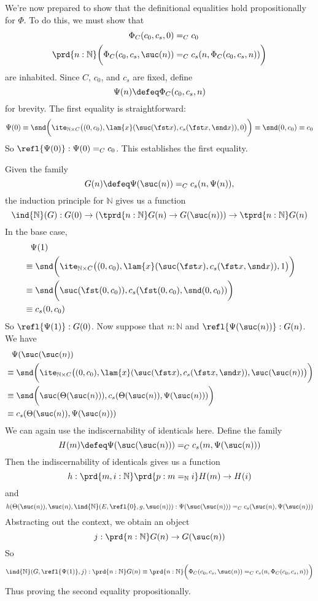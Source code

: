 We're now prepared to show that the definitional equalities hold
propositionally for $\Phi$.  To do this, we must show that
\begin{align*}
  \Phi_{C}(c_{0}, c_{s}, 0) &=_{C} c_{0} \\
  \prd{n:\mathbb{N}}\bigg(\Phi_{C}(c_{0}, c_{s}, \suc(n)) &=_{C} c_{s}(n,
  \Phi_{C}(c_{0}, c_{s}, n)) \bigg)
\end{align*}
are inhabited.  Since $C$, $c_{0}$, and $c_{s}$ are fixed, define
\[
  \Psi(n) \defeq \Phi_{C}(c_{0}, c_{s}, n)
\]
for brevity. The first equality is straightforward:
\[
  \Psi(0)
  \equiv
  \snd\bigg(
    \ite_{\mathbb{N} \times C}\big(
    (0, c_{0}),
    \lam{x}(\suc(\fst x), c_{s}(\fst x, \snd x)),
    0
    \big)
  \bigg)
  \equiv
  \snd(0, c_{0})
  \equiv
  c_{0}
\]
So $\refl{\Psi(0)} : \Psi(0) =_{C} c_{0}$.  This establishes
the first equality.  

Given the family
\[
  G(n) \defeq
  \Psi(\suc(n)) =_{C} c_{s}(n, \Psi(n)),
\]
the induction principle for $\mathbb{N}$ gives us a function
\[
  \ind{\mathbb{N}}(G) :
  G(0) \to \left(\tprd{n:\mathbb{N}} G(n) \to G(\suc(n))\right) \to
  \tprd{n:\mathbb{N}} G(n)
\]
In the base case,
\begin{align*}
  &\phantom{\equiv} \Psi(1)
  \\&\equiv
  \snd\bigg(
    \ite_{\mathbb{N} \times C}\big(
    (0, c_{0}),
    \lam{x}(\suc(\fst x), c_{s}(\fst x, \snd x)),
    1
    \big)
  \bigg)
  \\&\equiv
  \snd\bigg(
    \suc(\fst (0, c_{0})), c_{s}(\fst (0, c_{0}), \snd (0, c_{0}))
  \bigg)
  \\&\equiv
  c_{s}(0, c_{0})
\end{align*}
So $\refl{\Psi(1)} : G(0)$.  Now suppose that $n : \mathbb{N}$ and
$\refl{\Psi(\suc(n))} : G(n)$.  We have
\begin{align*}
  &\phantom{\equiv}\Psi(\suc(\suc(n))
  \\&\equiv
  \snd\bigg(
    \ite_{\mathbb{N} \times C}\big(
    (0, c_{0}),
    \lam{x}(\suc(\fst x), c_{s}(\fst x, \snd x)),
    \suc(\suc(n))
    \big)
  \bigg)
  \\&\equiv
  \snd\bigg(
    \suc(\Theta(\suc(n))), c_{s}(\Theta(\suc(n)), \Psi(\suc(n)))
  \bigg)
  \\&\equiv
  c_{s}(\Theta(\suc(n)), \Psi(\suc(n)))
\end{align*}
We can again use the indiscernability of identicals here.  Define the family
\[
  H(m) \defeq \Psi(\suc(\suc(n))) =_{C} c_{s}(m, \Psi(\suc(n))) 
\]
Then the indiscernability of identicals gives us a function
\[
  h: \prd{m, i : \mathbb{N}}\prd{p: m=_{\mathbb{N}} i} H(m) \to H(i)
\]
and
\[
  h(\Theta(\suc(n)), \suc(n), \ind{\mathbb{N}}(E, \refl{0}, g, \suc(n)))
  :
  \Psi(\suc(\suc(n))) =_{C} c_{s}(\suc(n), \Psi(\suc(n)))
\]
Abstracting out the context, we obtain an object
\[
  j : \prd{n:\mathbb{N}} G(n) \to G(\suc(n))
\]
So
\[
  \ind{\mathbb{N}}(G, \refl{\Psi(1)}, j) : \prd{n:\mathbb{N}} G(n)
  \equiv
  \prd{n:\mathbb{N}}\bigg(\Phi_{C}(c_{0}, c_{s}, \suc(n)) =_{C} c_{s}(n,
  \Phi_{C}(c_{0}, c_{s}, n)) \bigg)
\]
Thus proving the second equality propositionally.

